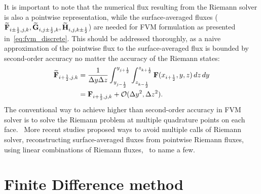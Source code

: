 It is important to note that the numerical flux resulting from the Riemann solver
is also a pointwise representation, while the surface-averaged fluxes
(\( \widetilde{\mathbf{F}}_{i \pm \frac{1}{2},j,k}, \widetilde{\mathbf{G}}_{i,j \pm \frac{1}{2},k}, \widetilde{\mathbf{H}}_{i,j,k \pm \frac{1}{2}} \))
are needed for FVM formulation as presented in~\cref{eq:fvm_discrete}.
This should be addressed thoroughly, as a naive approximation of the pointwise flux to
the surface-averaged flux is bounded by second-order accuracy no matter the accuracy of the Riemann states:
\begin{equation}\label{eq:fvm_need_quad}
    \begin{split}
        \widetilde{\mathbf{F}}_{{i+\frac{1}{2}},j,k} &= \frac{1}{\Delta y\Delta z} \int^{y_{{j+\frac{1}{2}}}}_{y_{{j-\frac{1}{2}}}} \int^{z_{{k+\frac{1}{2}}}}_{z_{{k-\frac{1}{2}}}} \mathbf{F}(x_{{i+\frac{1}{2}}}, y, z) \mathop{dz} \mathop{dy} \\
                                   &= \mathbf{F}_{{i+\frac{1}{2}},j,k} + \mathcal{O}(\Delta y^{2}, \Delta z^{2}).
    \end{split}
\end{equation}
The conventional way to achieve higher than second-order accuracy in FVM solver
is to solve the Riemann problem at multiple quadrature points
on each face.~\cite{titarev2004finite,mccorquodale2011high,zhang2011order}
More recent studies proposed ways to avoid multiple calls of Riemann solver,
reconstructing surface-averaged fluxes from pointwise Riemann fluxes,~\cite{buchmuller2014improved,felker2018fourth}
using linear combinations of Riemann fluxes,~\cite{dumbser2007quadrature,dumbser2008unified}
to name a few.


\section{Finite Difference method}\label{sec:fdm}

